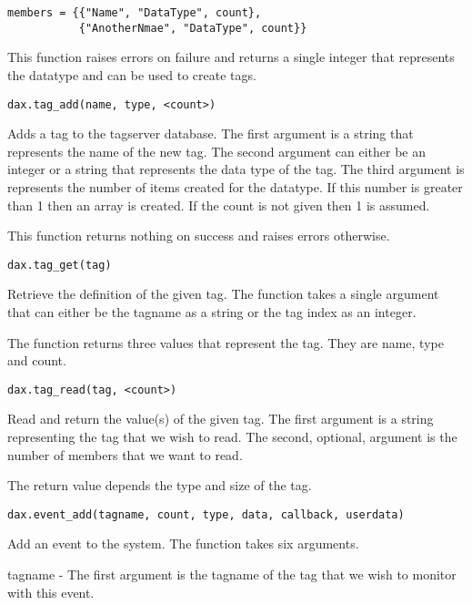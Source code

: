 \begin{verbatim}
members = {{"Name", "DataType", count},
           {"AnotherNmae", "DataType", count}}
\end{verbatim}

This function raises errors on failure and returns a single integer that represents the datatype and can be used to create tags.

\begin{verbatim}
dax.tag_add(name, type, <count>)
\end{verbatim}

Adds a tag to the tagserver database.  The first argument is a string that represents the name of the new tag.  The second argument can either be an integer or a string that represents the data type of the tag.  The third argument is represents the number of items created for the datatype.  If this number is greater than 1 then an array is created.  If the count is not given then 1 is assumed.

This function returns nothing on success and raises errors otherwise.

\begin{verbatim}
dax.tag_get(tag)
\end{verbatim}
Retrieve the definition of the given tag.  The function takes a single argument that can either be the tagname as a string or the tag index as an integer.

The function returns three values that represent the tag.  They are name, type and count.

\begin{verbatim}
dax.tag_read(tag, <count>)
\end{verbatim}
Read and return the value(s) of the given tag.  The first argument is a string representing the tag that we wish to read.  The second, optional, argument is the number of members that we want to read.

The return value depends the type and size of the tag.

\begin{verbatim}
dax.event_add(tagname, count, type, data, callback, userdata)
\end{verbatim}
Add an event to the system.  The function takes six arguments.

tagname - The first argument is the tagname of the tag that we wish to monitor with this event.

